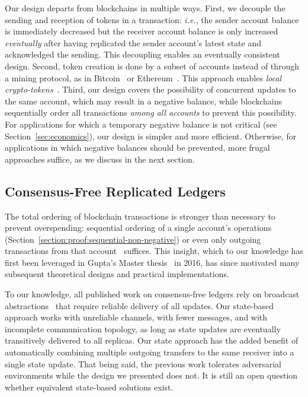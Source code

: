 \documentclass[9pt]{article}   	%
\begin{document}
Our design departs from blockchains in multiple ways. First, we decouple the sending and reception of tokens in a transaction: \textit{i.e.}, the sender account balance is immediately decreased but the receiver account balance is only increased \textit{eventually} after having replicated the sender account's latest state and acknowledged the sending. This decoupling enables an eventually consistent design. Second, token creation is done by a subset of accounts instead of through a mining protocol, as in Bitcoin~\cite{nakamoto2008bitcoin} or Ethereum~\cite{buterin2014next}. This approach enables \textit{local crypto-tokens}~\cite{lavoie2022localcryptotokens}. Third, our design covers the possibility of concurrent updates to the same account, which may result in a negative balance, while blockchains sequentially order all transactions \textit{among all accounts} to prevent this possibility. For applications for which a temporary negative balance is not critical (see Section~\ref{sec:economics}), our design is simpler and more efficient. Otherwise, for applications in which negative balances should be prevented, more frugal approaches suffice, as we discuss in the next section. 

\subsection{Consensus-Free Replicated Ledgers}
\label{sec:consensus-free-ledgers}

The total ordering of blockchain transactions is stronger than necessary to prevent overspending: sequential ordering of a single account's operations (Section~\ref{section:proof:sequential-non-negative}) or even only outgoing transactions from that account~\cite{guerraoui2021consensus} suffices. This insight, which to our knowledge has first been leveraged in Gupta's Master thesis~\cite{gupta2016nonconsensusdft} in 2016, has since motivated many subsequent theoretical designs and practical implementations. 

To our knowledge, all published work on consensus-free ledgers rely on broadcast abstractions~\cite{collins2020broadcast-payment,baudet2020fastpay,sliwinski2020abc,guerraoui2021consensus,auvolat2021money,frey:hal-03346756,kuznetsov2021permissionless,cholvi2021bdso,georghiades2021needs} that require reliable delivery of all updates. Our state-based approach works with unreliable channels, with fewer messages, and with incomplete communication topology, as long as state updates are eventually transitively delivered to all replicas. Our state approach has the added benefit of automatically combining multiple outgoing transfers to the same receiver into a single state update. That being said, the previous work tolerates adversarial environments while the design we presented does not. It is still an open question whether equivalent state-based solutions exist.
\end{document}
